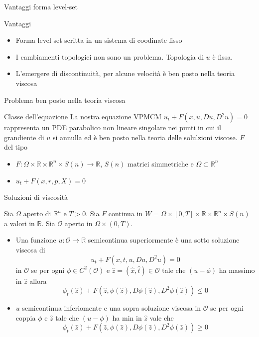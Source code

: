 \begin{frame}{Vantaggi forma level-set}
 \begin{block}{Vantaggi}
   \begin{itemize}
     \item Forma level-set scritta in un sistema di coodinate fisso
     \item I cambiamenti topologici non sono un problema. Topologia di
       $u$ è fissa.
     \item L'emergere di discontinuità, per alcune velocità è ben
       posto nella teoria viscosa
   \end{itemize}
 \end{block}

\end{frame}



\begin{frame}{Problema ben posto nella teoria viscosa}
     \begin{block}{Classe dell'equazione}
       La nostra equazione VPMCM \alert{$u_t+F(x,u,Du,D^2u)=0$}
       rappresenta un PDE parabolico non lineare singolare nei punti in cui
       il grandiente di $u$ si annulla ed è ben posto nella teoria
       delle solulzioni viscose. $F$ del tipo
       \begin{itemize}
         \item $F:\Omega\times\mathbb{R}\times\mathbb{R}^n\times
           S(n)\to\mathbb{R}$, $S(n)$ matrici simmetriche e
           $\Omega\subset\mathbb{R}^n$
         \item $u_t+F(x,r,p,X)=0$
       \end{itemize}
     \end{block}
\end{frame}

\begin{frame}{Soluzioni di viscosità}
  \begin{definizione}
    Sia $\Omega$ aperto di $\mathbb{R}^n$ e $T>0$. Sia $F$ continua in
    $W=\overline{\Omega}\times
    [0,T]\times\mathbb{R}\times\mathbb{R}^n\times S(n)$ a valori in
    $\mathbb{R}$. Sia $\mathcal{O}$ aperto in $\Omega\times(0,T)$.
    \begin{itemize}
      \item Una funzione $u:\mathcal{O}\to\mathbb{R}$ semicontinua
        superiormente è una \alert{sotto
          soluzione viscosa} di 
        \[
        u_t+F(x,t,u,Du,D^2u)=0
        \]
        in $\mathcal{O}$ se per ogni $\phi\in C^2(\mathcal{O})$ e
        $\hat{z}=(\hat{x},\hat{t})\in\mathcal{O}$ tale che $(u-\phi)$ ha
        massimo in $\hat{z}$ allora
        \[
        \phi_t(\hat{z})+F(\hat{z},\phi(\hat{z}),D\phi(\hat{z}),D^2\phi(\hat{z}))\leq 0
        \]
        \item $u$ semicontinua inferiomente e una \alert{sopra
          soluzione viscosa}  in $\mathcal{O}$ se per ogni coppia
          $\phi$ e $\hat{z}$ tale che $(u-\phi)$ ha min in $\hat{z}$
          vale che
          \[
          \phi_t(\hat{z})+F(\hat{z},\phi(\hat{z}),D\phi(\hat{z}),D^2\phi(\hat{z}))\geq 0
          \]
        \end{itemize}
  \end{definizione}
\end{frame}

